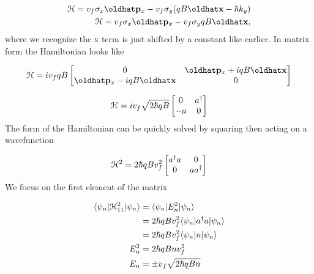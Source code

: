 \begin{align}
  \ham = v_f \sigma_x \op{p}_x - v_f \sigma_y (qB\op{x} - \hbar k_y) \nonumber \\
  \ham = v_f \sigma_x \op{p}_x - v_f \sigma_y qB\op{x},
\end{align}
where we recognize the x term is just shifted by a constant like earlier.
In matrix form the Hamiltonian looks like

\[
  \ham = i v_f q B
  \begin{bmatrix}
    0 & \op{p}_x + iqB\op{x} \\
    \op{p}_x - iqB\op{x} & 0
  \end{bmatrix}
\]

\[
  \mathcal{H} = i v_f \sqrt{2\hbar qB}
  \begin{bmatrix}
    0 & a^{\dagger}\\
    -a & 0
  \end{bmatrix}
\]
The form of the Hamiltonian can be quickly solved by squaring then acting on a wavefunction

\[
  \mathcal{H}^2 = 2\hbar qB  v_f^2
  \begin{bmatrix}
    a^{\dagger} a & 0 \\
    0 & aa^{\dagger}
  \end{bmatrix}
\]
We focus on the first element of the matrix

\begin{align}
  \langle \psi_n | \mathcal{H}_{11}^2 |\psi_n\rangle &= \langle \psi_n | E_n^2 |\psi_n\rangle \nonumber \\
    &= 2 \hbar qB v_f^2 \langle \psi_n | a^{\dagger} a |\psi_n\rangle \nonumber \\
    &= 2 \hbar qB v_f^2 \langle \psi_n | n |\psi_n\rangle \nonumber \\
    E_n^2 &= 2 \hbar qB n v_f^2 \nonumber \\
    E_n &= \pm v_f \sqrt{2\hbar qB n}
\end{align}

